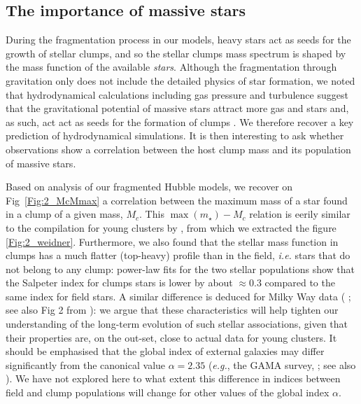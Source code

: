 \subsection*{The importance of massive stars}


During the fragmentation process in our models, heavy stars act as seeds for the growth of stellar clumps, and so the stellar clumps mass spectrum is shaped by the mass function of the available {\it stars}. Although the fragmentation through gravitation only does not include the detailed physics of star formation, we noted that hydrodynamical calculations including gas pressure and turbulence suggest that the gravitational potential of massive stars attract more gas and stars and, as such, act act as seeds for the formation of clumps \citep{Bonnell2004}. We therefore recover a key prediction of hydrodynamical simulations. It is then interesting to ask whether observations show a correlation between the host clump mass and its population of massive stars.

 Based on analysis of our fragmented Hubble models, we recover on Fig~\ref{Fig:2_McMmax} a correlation between the maximum mass of a star found in a clump of a given mass, $M_c$. This $\max(m_\star) - M_c $ relation is eerily similar to the compilation for young clusters by \citet{Weidner2013}, from which we extracted the figure \ref{Fig:2_weidner}. Furthermore, we also found that the stellar mass function in clumps has a much flatter (top-heavy) profile than in the field, {\it i.e.} stars that do not belong to any clump: power-law fits for the two stellar populations show that the Salpeter index for clumps stars is lower by about $\approx 0.3$ compared to the same index for field stars. A similar difference is deduced for Milky Way data ( \citealt{Czekaj2014,Rybizki2015}; see also Fig 2 from \citealt{Bastian2010}):  we argue that these characteristics will help tighten our understanding of the long-term evolution of such stellar associations, given that their properties are, on the out-set, close to actual data for young clusters. It should be emphasised that the global index of external galaxies may differ significantly from the canonical value $\alpha = 2.35$ ({\it e.g.}, the GAMA survey, \citealt{Gunawardhana2011}; see also \citealt{Hoversten2008}). We have not explored here to what extent this difference in indices  between field and clump populations will change for other values of the global index $\alpha$.

